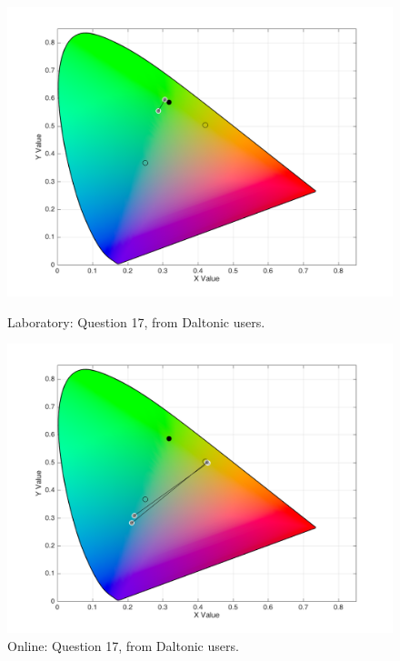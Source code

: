 \begin{figure}[!htbp]
  \centering
  \begin{minipage}{0.4\textwidth}
    \centering
    \includegraphics[width=\textwidth]{images/results/17_lab_daltonicUsers.png}
    \caption[Laboratory: Answers for Question 17, from daltonic users.]{Laboratory: Question 17, from Daltonic users.}
    \label{fig:dalt_3}
  \end{minipage}
  \begin{minipage}{0.4\textwidth}
    \centering
    \includegraphics[width=\textwidth]{images/results/17_online_daltonicUsers.png}
    \caption[Online: Answers for Question 17, from daltonic users.]{Online: Question 17, from Daltonic users.}
    \label{fig:dalt_4}
  \end{minipage}
\end{figure} \\ \par
